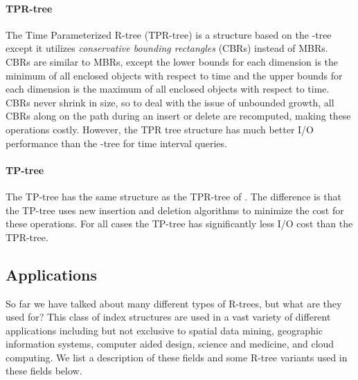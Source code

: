 \paragraph{TPR-tree} The Time Parameterized R-tree (TPR-tree) 
\cite{vsaltenis2000indexing} is a structure based on the \rstar-tree 
except it utilizes \emph{conservative bounding rectangles} (CBRs) 
instead of MBRs. CBRs are similar to MBRs, except the lower bounds for 
each dimension is the minimum of all enclosed objects with respect to 
time and the upper bounds for each dimension is the maximum of all 
enclosed objects with respect to time. CBRs never shrink in size, so to 
deal with the issue of unbounded growth, all CBRs along on the path 
during an insert or delete are recomputed, making these operations costly. 
However, the TPR tree structure has much better I/O performance than the 
\rstar-tree for time interval queries. 

\paragraph{TP\rstar-tree} The TP\rstar-tree \cite{tao2003tpr} has the same 
structure as the TPR-tree of \cite{vsaltenis2000indexing}. The difference
is that the TP\rstar-tree uses new insertion and deletion algorithms to 
minimize the cost for these operations. For all cases the TP\rstar-tree
has significantly less I/O cost than the TPR-tree. 


\subsection{Applications}
So far we have talked about many different types of R-trees, but what are they
used for? This class of index structures are used in a vast variety of different
applications including but not exclusive to spatial data mining, geographic 
information systems, computer aided design, science and medicine, and cloud 
computing. We list a description of these fields and some R-tree variants used 
in these fields below.

